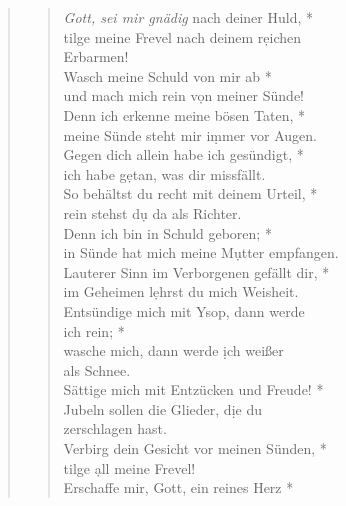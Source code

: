 \def\greinitialformat#1{{\fontsize{40}{40}\selectfont #1}}
\gresetfirstlineaboveinitial{\small \textcolor{red}{ Ps 51 }}{}
\setaboveinitialseparation{0.72mm}


\vspace{0.3cm}

\begin{quote}
 

\begin{verse}
 \textit{Gott, sei mir gnädig} nach deiner Huld, *\\
tilge meine Frevel nach deinem r\d eichen\\ Erbarmen! \\
\vin Wasch meine Schuld von mir ab *\\
\vin und mach mich rein v\d on meiner Sünde!\\
Denn ich erkenne meine bösen Taten, *\\
meine Sünde steht mir i\d mmer vor Augen. \\
\vin Gegen dich allein habe ich gesündigt, *\\
\vin ich habe g\d etan, was dir missfällt. \\
So behältst du recht mit deinem Urteil, *\\ rein stehst d\d u da als Richter. \\
\vin Denn ich bin in Schuld geboren; *\\
\vin in Sünde hat mich meine M\d utter empfangen. \\
Lauterer Sinn im Verborgenen gefällt dir, *\\
im Geheimen l\d ehrst du mich Weisheit.\\
\vin Entsündige mich mit Ysop, dann werde \\ \vin ich rein; *\\
\vin wasche mich, dann werde \d ich weißer\\ \vin als Schnee. \\
Sättige mich mit Entzücken und Freude! *\\
Jubeln sollen die Glieder, d\d ie du \\zerschlagen hast.\\
\vin Verbirg dein Gesicht vor meinen Sünden, *\\
\vin tilge \d all meine Frevel!\\
Erschaffe mir, Gott, ein reines Herz *\\

\end{verse}
\end{quote}
